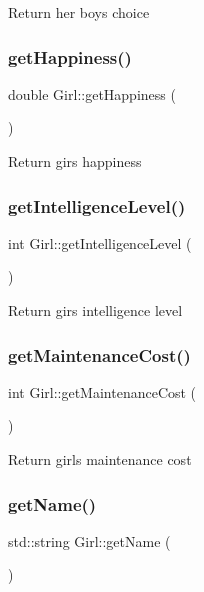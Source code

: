 Return her boy\textquotesingle{}s choice \mbox{\label{class_girl_adf0956456e02324db90c009c0c3c47d3}} 
\subsubsection{\texorpdfstring{get\+Happiness()}{getHappiness()}}
{\footnotesize\ttfamily double Girl\+::get\+Happiness (\begin{DoxyParamCaption}{ }\end{DoxyParamCaption})}

Return gir\textquotesingle{}s happiness \mbox{\label{class_girl_a8b9ea4f67c0e682f65fb683f1c1ee766}} 
\subsubsection{\texorpdfstring{get\+Intelligence\+Level()}{getIntelligenceLevel()}}
{\footnotesize\ttfamily int Girl\+::get\+Intelligence\+Level (\begin{DoxyParamCaption}{ }\end{DoxyParamCaption})}

Return gir\textquotesingle{}s intelligence level \mbox{\label{class_girl_a8fa9751cb04f9c510a635c9f19a1d4d9}} 
\subsubsection{\texorpdfstring{get\+Maintenance\+Cost()}{getMaintenanceCost()}}
{\footnotesize\ttfamily int Girl\+::get\+Maintenance\+Cost (\begin{DoxyParamCaption}{ }\end{DoxyParamCaption})}

Return girl\textquotesingle{}s maintenance cost \mbox{\label{class_girl_a27a705fb94b92dfd6929d0bf4bcaf5e1}} 
\subsubsection{\texorpdfstring{get\+Name()}{getName()}}
{\footnotesize\ttfamily std\+::string Girl\+::get\+Name (\begin{DoxyParamCaption}{ }\end{DoxyParamCaption})}

